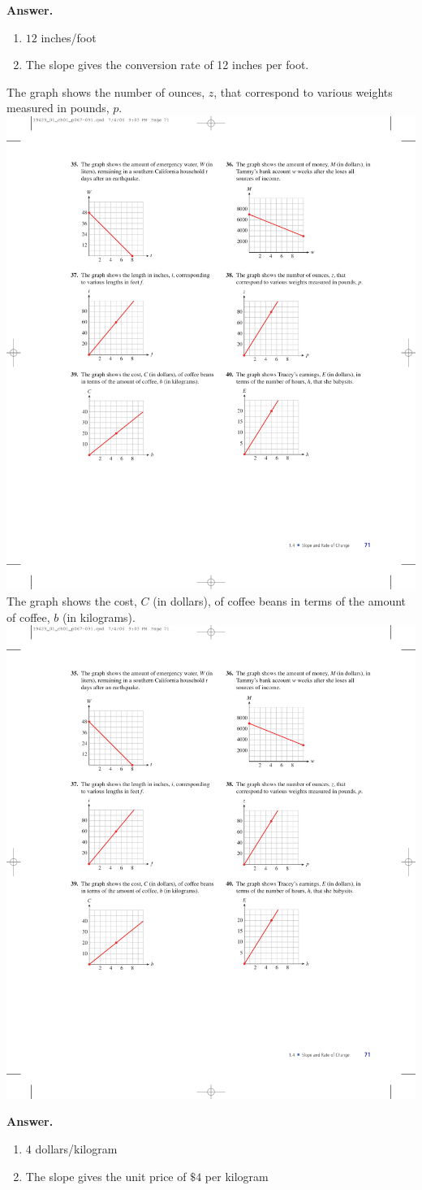 \documentclass[10pt,]{book}
\theoremstyle{plain}
\theoremstyle{definition}
\theoremstyle{definition}
\theoremstyle{definition}
\theoremstyle{definition}
\numberwithin{equation}{part}
\begin{document}
\begin{exerciselist}
\begin{exercisegroup}
%
\par\smallskip
\noindent\textbf{Answer.}\hypertarget{answer-144}{}\quad
\leavevmode%
\begin{enumerate}[label=*\alph**]
\item\hypertarget{li-1016}{}\(12\)  inches/foot%
\item\hypertarget{li-1017}{}The slope gives the conversion rate of 12 inches per foot.%
\end{enumerate}
%
\exercise[38.]\hypertarget{exercise-253}{}The graph shows the number of ounces, \(z\), that correspond to various weights measured in pounds, \(p\). \includegraphics[width=0.4\linewidth]{images/fig-ex-1-4-38}
%
\exercise[39.]\hypertarget{exercise-254}{}The graph shows the cost, \(C\) (in dollars), of coffee beans in terms of the amount of coffee, \(b\) (in kilograms). \includegraphics[width=0.4\linewidth]{images/fig-ex-1-4-39}
%
\par\smallskip
\noindent\textbf{Answer.}\hypertarget{answer-145}{}\quad
\leavevmode%
\begin{enumerate}[label=*\alph**]
\item\hypertarget{li-1018}{}\(4\) dollars/kilogram%
\item\hypertarget{li-1019}{}The slope gives the unit price of \(\$4\) per kilogram%
\end{enumerate}
%

\end{exercisegroup}
\end{exerciselist}
\end{document}
